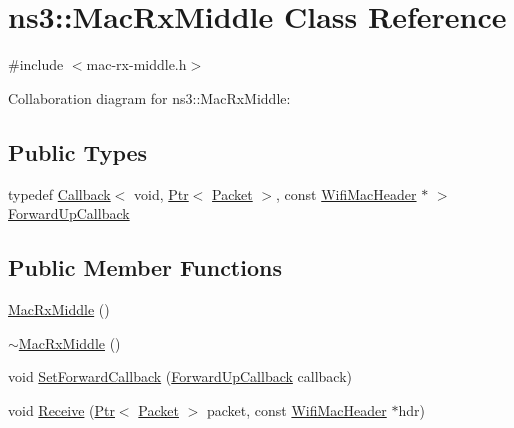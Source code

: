 \hypertarget{classns3_1_1MacRxMiddle}{}\section{ns3\+:\+:Mac\+Rx\+Middle Class Reference}
\label{classns3_1_1MacRxMiddle}


{\ttfamily \#include $<$mac-\/rx-\/middle.\+h$>$}



Collaboration diagram for ns3\+:\+:Mac\+Rx\+Middle\+:
\subsection*{Public Types}
\begin{DoxyCompactItemize}
\item 
typedef \hyperlink{classns3_1_1Callback}{Callback}$<$ void, \hyperlink{classns3_1_1Ptr}{Ptr}$<$ \hyperlink{classns3_1_1Packet}{Packet} $>$, const \hyperlink{classns3_1_1WifiMacHeader}{Wifi\+Mac\+Header} $\ast$ $>$ \hyperlink{classns3_1_1MacRxMiddle_ad1a3ee168f7826b71385af2cec382c81}{Forward\+Up\+Callback}
\end{DoxyCompactItemize}
\subsection*{Public Member Functions}
\begin{DoxyCompactItemize}
\item 
\hyperlink{classns3_1_1MacRxMiddle_ad5e9444715075c030d217fda0c6a106f}{Mac\+Rx\+Middle} ()
\item 
\hyperlink{classns3_1_1MacRxMiddle_ac2fdebcc15760fd5ee01420d5cc76002}{$\sim$\+Mac\+Rx\+Middle} ()
\item 
void \hyperlink{classns3_1_1MacRxMiddle_a0ad2ae4b6ac935309311eae2997bd9b8}{Set\+Forward\+Callback} (\hyperlink{classns3_1_1MacRxMiddle_ad1a3ee168f7826b71385af2cec382c81}{Forward\+Up\+Callback} callback)
\item 
void \hyperlink{classns3_1_1MacRxMiddle_a924ddb6f8cea2daa6701325c7422dc59}{Receive} (\hyperlink{classns3_1_1Ptr}{Ptr}$<$ \hyperlink{classns3_1_1Packet}{Packet} $>$ packet, const \hyperlink{classns3_1_1WifiMacHeader}{Wifi\+Mac\+Header} $\ast$hdr)
\end{DoxyCompactItemize}
